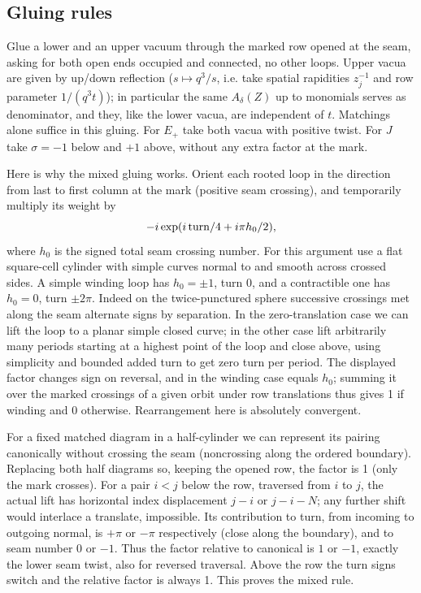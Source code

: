 \subsection{Gluing rules}\label{L:step3}

Glue a lower and an upper vacuum through the marked row opened at the seam, asking for both open ends occupied and connected, no other loops. Upper vacua are given by up/down reflection (\(s\mapsto q^3/s\), i.e. take spatial rapidities \(z_j^{-1}\) and row parameter \(1/(q^3t)\)); in particular the same \(A_\delta(Z)\) up to monomials serves as denominator, and they, like the lower vacua, are independent of \(t\). Matchings alone suffice in this gluing. For \(E_+\) take both vacua with positive twist. For \(J\) take \(\sigma=-1\) below and \(+1\) above, without any extra factor at the mark.

Here is why the mixed gluing works. Orient each rooted loop in the direction from last to first column at the mark (positive seam crossing), and temporarily multiply its weight by
\[
 -i\exp(i\,{\rm turn}/4+i\pi h_0/2),
\]
where \(h_0\) is the signed total seam crossing number. For this argument use a flat square-cell cylinder with simple curves normal to and smooth across crossed sides. A simple winding loop has \(h_0=\pm1\), turn 0, and a contractible one has \(h_0=0\), turn \(\pm2\pi\). Indeed on the twice-punctured sphere successive crossings met along the seam alternate signs by separation. In the zero-translation case we can lift the loop to a planar simple closed curve; in the other case lift arbitrarily many periods starting at a highest point of the loop and close above, using simplicity and bounded added turn to get zero turn per period. The displayed factor changes sign on reversal, and in the winding case equals \(h_0\); summing it over the marked crossings of a given orbit under row translations thus gives 1 if winding and 0 otherwise. Rearrangement here is absolutely convergent.

For a fixed matched diagram in a half-cylinder we can represent its pairing canonically without crossing the seam (noncrossing along the ordered boundary). Replacing both half diagrams so, keeping the opened row, the factor is 1 (only the mark crosses). For a pair \(i<j\) below the row, traversed from \(i\) to \(j\), the actual lift has horizontal index displacement \(j-i\) or \(j-i-N\); any further shift would interlace a translate, impossible. Its contribution to turn, from incoming to outgoing normal, is \(+\pi\) or \(-\pi\) respectively (close along the boundary), and to seam number 0 or \(-1\). Thus the factor relative to canonical is \(1\) or \(-1\), exactly the lower seam twist, also for reversed traversal. Above the row the turn signs switch and the relative factor is always 1. This proves the mixed rule.

